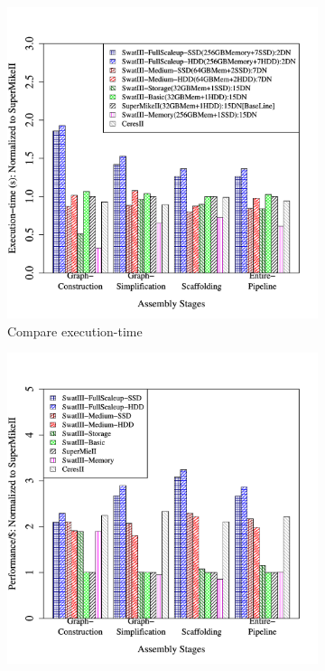 \documentclass[conference]{IEEEtran}
\begin{document}
\begin{figure}[htb]
        \begin{subfigure}[b]{0.5\textwidth}
                \includegraphics[width=\textwidth]{Figure/PerormanceData/Plots/PerfDiffArch.pdf}
                \caption{Compare execution-time}
                \label{fig:DifferentArchitecturesPerf}
        \end{subfigure}
        \begin{subfigure}[b]{0.5\textwidth}
                \includegraphics[width=\textwidth]{Figure/PerormanceData/Plots/PerfPerDollarDiffArch.pdf}

\end{subfigure}
\end{figure}
\end{document}
